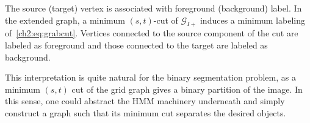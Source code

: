 The source (target) vertex is associated with foreground (background) label. In the extended graph, a minimum $(s,t)$-cut of $\mathcal{G}_{I+}$ induces a minimum labeling of~\cref{ch2:eq:grabcut}. Vertices connected to the source component of the cut are labeled as foreground and those connected to the target are labeled as background. 

This interpretation is quite natural for the binary segmentation problem, as a minimum $(s,t)$ cut of the grid graph gives a binary partition of the image. In this sense, one could abstract the HMM machinery underneath and simply construct a graph such that its minimum cut separates the desired objects.

\begin{figure}
\center
{}
\end{figure}

